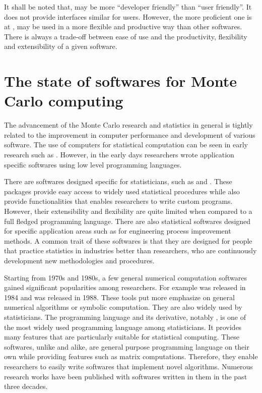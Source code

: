 It shall be noted that, \vsmc may be more ``developer friendly'' than ``user
friendly''. It does not provide interfaces similar \bugs for users. However,
the more proficient one is at \cpp, \vsmc may be used in a more flexible and
productive way than other softwares. There is always a trade-off between ease
of use and the productivity, flexibility and extensibility of a given
software.

\section{The state of softwares for Monte Carlo computing}
\label{sec:The state of softwares for Monte Carlo computing}

The advancement of the Monte Carlo research and statistics in general is
tightly related to the improvement in computer performance and development of
various software. The use of computers for statistical computation can be seen
in early research such as \cite{metropolis1953}. However, in the early days
researchers wrote application specific softwares using low level programming
languages.

There are softwares designed specific for statisticians, such as \sas and
\spss. These packages provide easy access to widely used statistical
procedures while also provide functionalities that enables researchers to
write custom programs. However, their extensibility and flexibility are quite
limited when compared to a full fledged programming language. There are also
statistical softwares designed for specific application areas such as \minitab
for engineering process improvement methods. A common trait of these softwares
is that they are designed for people that practice statistics in industries
better than researchers, who are continuously development new methodologies
and procedures.

Starting from 1970s and 1980s, a few general numerical computation softwares
gained significant popularities among researchers. For example \matlab was
released in 1984 and \mathematica was released in 1988. These tools put more
emphasize on general numerical algorithms or symbolic computation. They are
also widely used by statisticians. The \slang programming language and its
derivative, notably \rlang \cite{rlang}, is one of the most widely used
programming language among statisticians. It provides many features that are
particularly suitable for statistical computing. These softwares, unlike \sas
and alike, are general purpose programming language on their own while
providing features such as matrix computations. Therefore, they enable
researchers to easily write softwares that implement novel algorithms.
Numerous research works have been published with softwares written in them in
the past three decades.

